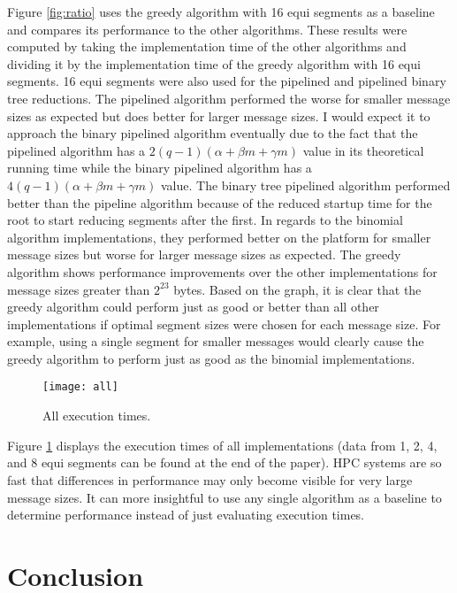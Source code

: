 \documentclass{article}
\begin{document}
Figure \ref{fig:ratio} uses the greedy algorithm with 16 equi segments as a baseline and
compares its performance to the other algorithms. These results were computed by taking the
implementation time of the other algorithms and dividing it by the implementation time of the greedy
algorithm with 16 equi segments. 16 equi segments were also used for the pipelined and pipelined binary
tree reductions. The pipelined algorithm performed the worse for smaller message sizes as expected but
does better for larger message sizes. I would expect it to approach the binary pipelined algorithm
eventually due to the fact that the pipelined algorithm has a $2(q-1)(\alpha + \beta m + \gamma m)$ value in its
theoretical running time while the binary pipelined algorithm has a $4(q-1)(\alpha + \beta m + \gamma m)$ value. 
The binary tree pipelined algorithm performed better than the pipeline algorithm because of the reduced startup
time for
the root to start reducing segments after the first. In regards to the binomial algorithm implementations,
they performed better on the platform for smaller message sizes but worse for larger message sizes as
expected. The greedy algorithm shows performance improvements over the other implementations for
message sizes greater than $2^{23}$ bytes. Based on the graph, it is clear that the greedy algorithm could
perform just as good or better than all other implementations if optimal segment sizes were
chosen for each message size. For example, using a single segment for smaller messages would
clearly cause the greedy algorithm to perform just as good as the binomial implementations.


\begin{figure}[h]
    \centering
    \texttt{[image: all]}
    \caption{All execution times.}
    \label{fig:all}
\end{figure}


Figure \ref{fig:all} displays the execution
times of all implementations (data from 1, 2, 4,
and 8 equi segments can be found at the end of
the paper). HPC systems are so fast that
differences in performance may only become
visible for very large message sizes. It can more insightful to use any single
algorithm as a baseline to determine
performance instead of just evaluating
execution times.

\section{Conclusion}
\end{document}
